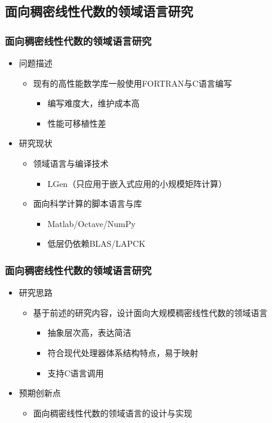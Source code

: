 \documentclass[aspectratio=169]{beamer}
\begin{document}
\subsection[领域语言研究]{面向稠密线性代数的领域语言研究}

\begin{frame}
  \frametitle{面向稠密线性代数的领域语言研究}
  \begin{itemize}
  \item 问题描述
    \begin{itemize}
    \item 现有的高性能数学库一般使用FORTRAN与C语言编写
      \begin{itemize}
      \item 编写难度大，维护成本高
      \item 性能可移植性差
      \end{itemize}
    \end{itemize}
  \item 研究现状
    \begin{itemize}
    \item 领域语言与编译技术
      \begin{itemize}
      \item LGen（只应用于嵌入式应用的小规模矩阵计算）
      \end{itemize}
    \item 面向科学计算的脚本语言与库
      \begin{itemize}
      \item Matlab/Octave/NumPy
      \item 低层仍依赖BLAS/LAPCK
      \end{itemize}
    \end{itemize}
  \end{itemize}
\end{frame}

\begin{frame}
  \frametitle{面向稠密线性代数的领域语言研究}
  \begin{itemize}
  \item 研究思路
    \begin{itemize}
    \item 基于前述的研究内容，设计面向大规模稠密线性代数的领域语言
      \begin{itemize}
      \item 抽象层次高，表达简洁
      \item 符合现代处理器体系结构特点，易于映射
      \item 支持C语言调用
      \end{itemize}
    \end{itemize}
  \item 预期创新点
    \begin{itemize}
    \item 面向稠密线性代数的领域语言的设计与实现
    \end{itemize}
  \end{itemize}
\end{frame}
\end{document}
